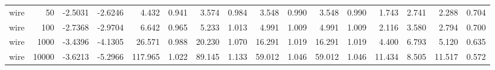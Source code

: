 \begin{tabular}{lrrrrrrrrrrrrrrr}
wire & 50 & -2.5031 & -2.6246 & 4.432 & 0.941 & 3.574 & 0.984 & 3.548 & 0.990 & 3.548 & 0.990 & 1.743 & 2.741 & 2.288 & 0.704 \\
wire & 100 & -2.7368 & -2.9704 & 6.642 & 0.965 & 5.233 & 1.013 & 4.991 & 1.009 & 4.991 & 1.009 & 2.116 & 3.580 & 2.794 & 0.700 \\
wire & 1000 & -3.4396 & -4.1305 & 26.571 & 0.988 & 20.230 & 1.070 & 16.291 & 1.019 & 16.291 & 1.019 & 4.400 & 6.793 & 5.120 & 0.635 \\
wire & 10000 & -3.6213 & -5.2966 & 117.965 & 1.022 & 89.145 & 1.133 & 59.012 & 1.046 & 59.012 & 1.046 & 11.434 & 8.505 & 11.517 & 0.572 \\
\bottomrule
\end{tabular}
